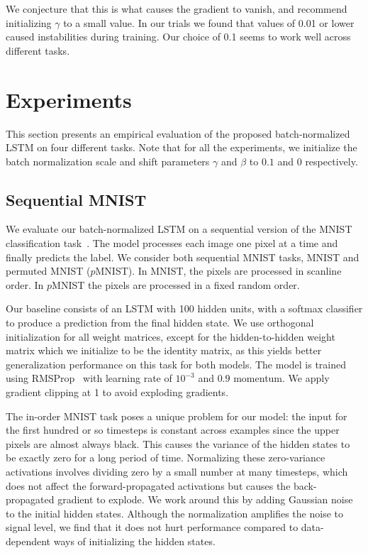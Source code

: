 \documentclass{article} %
\begin{document}
We conjecture that this is what causes the gradient to vanish, and recommend
initializing $\gamma$ to a small value.  In our trials we found that values of
0.01 or lower caused instabilities during training.  Our choice of 0.1 seems to
work well across different tasks.

\section{Experiments}
\label{sec:experiments}

This section presents an empirical evaluation of the proposed batch-normalized
LSTM on four different tasks.  Note that for all the experiments, we initialize
the batch normalization scale and shift parameters $\gamma$ and $\beta$ to
$0.1$ and $0$ respectively.

\subsection{Sequential MNIST}
\label{sec:seqmnist}

We evaluate our batch-normalized LSTM on a sequential version of the MNIST
classification task~\citep{le2015simple}.  The model processes each image one
pixel at a time and finally predicts the label.  We consider both sequential
MNIST tasks, MNIST and permuted MNIST ($p$MNIST).  In MNIST, the pixels are
processed in scanline order.  In $p$MNIST the pixels are processed in a fixed
random order.

Our baseline consists of an LSTM with 100 hidden units, with a softmax
classifier to produce a prediction from the final hidden state.  We use
orthogonal initialization for all weight matrices, except for the
hidden-to-hidden weight matrix which we initialize to be the identity matrix,
as this yields better generalization performance on this task for both models.
The model is trained using RMSProp~\citep{rmsprop} with learning rate of
$10^{-3}$ and $0.9$ momentum.  We apply gradient clipping at 1 to avoid
exploding gradients.

The in-order MNIST task poses a unique problem for our model: the input for the
first hundred or so timesteps is constant across examples since the upper
pixels are almost always black.  This causes the variance of the hidden states
to be exactly zero for a long period of time.  Normalizing these zero-variance
activations involves dividing zero by a small number at many timesteps, which
does not affect the forward-propagated activations but causes the
back-propagated gradient to explode.  We work around this by adding Gaussian
noise to the initial hidden states.  Although the normalization amplifies the
noise to signal level, we find that it does not hurt performance compared to
data-dependent ways of initializing the hidden states.
\end{document}
